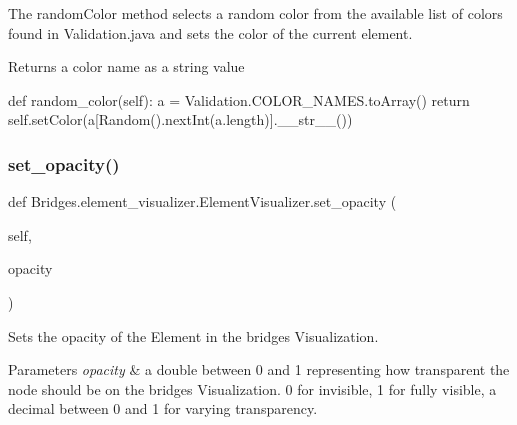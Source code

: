 The random\+Color method selects a random color from the available list of colors found in Validation.\+java and sets the color of the current element. 

\begin{DoxyReturn}{Returns}
a color name as a string value
\end{DoxyReturn}
def random\+\_\+color(self)\+: a = Validation.\+C\+O\+L\+O\+R\+\_\+\+N\+A\+M\+E\+S.\+to\+Array() return self.\+set\+Color(a\mbox{[}Random().next\+Int(a.\+length)\mbox{]}.\+\_\+\+\_\+str\+\_\+\+\_\+()) \mbox{\label{class_bridges_1_1element__visualizer_1_1_element_visualizer_a16a1f22e7033c940d7b9cd5b4d0bc67c}} 
\subsubsection{\texorpdfstring{set\+\_\+opacity()}{set\_opacity()}}
{\footnotesize\ttfamily def Bridges.\+element\+\_\+visualizer.\+Element\+Visualizer.\+set\+\_\+opacity (\begin{DoxyParamCaption}\item[{}]{self,  }\item[{}]{opacity }\end{DoxyParamCaption})}



Sets the opacity of the Element in the bridges Visualization. 


\begin{DoxyParams}{Parameters}
{\em opacity} & a double between 0 and 1 representing how transparent the node should be on the bridges Visualization. 0 for invisible, 1 for fully visible, a decimal between 0 and 1 for varying transparency. \\
\hline
\end{DoxyParams}
\mbox{\label{class_bridges_1_1element__visualizer_1_1_element_visualizer_a577c5842df4a7156bca91b19a8b1ccd5}} 
